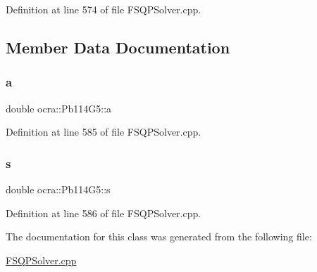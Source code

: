 Definition at line 574 of file F\+S\+Q\+P\+Solver.\+cpp.



\subsection{Member Data Documentation}
\hypertarget{classocra_1_1Pb114G5_a36c7950fd1d7556715ae7e0749e88211}{}\label{classocra_1_1Pb114G5_a36c7950fd1d7556715ae7e0749e88211} 
\subsubsection{\texorpdfstring{a}{a}}
{\footnotesize\ttfamily double ocra\+::\+Pb114\+G5\+::a\hspace{0.3cm}{\ttfamily [protected]}}



Definition at line 585 of file F\+S\+Q\+P\+Solver.\+cpp.

\hypertarget{classocra_1_1Pb114G5_a97daa687d5cec8995656fa8787f8a89e}{}\label{classocra_1_1Pb114G5_a97daa687d5cec8995656fa8787f8a89e} 
\subsubsection{\texorpdfstring{s}{s}}
{\footnotesize\ttfamily double ocra\+::\+Pb114\+G5\+::s\hspace{0.3cm}{\ttfamily [protected]}}



Definition at line 586 of file F\+S\+Q\+P\+Solver.\+cpp.



The documentation for this class was generated from the following file\+:\begin{DoxyCompactItemize}
\item 
\hyperlink{FSQPSolver_8cpp}{F\+S\+Q\+P\+Solver.\+cpp}\end{DoxyCompactItemize}
